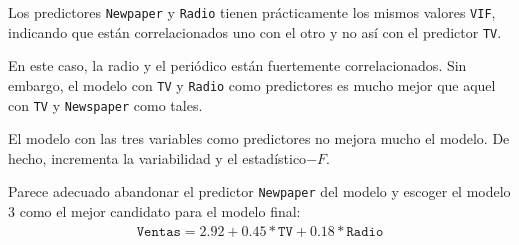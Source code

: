 Los predictores \texttt{Newpaper} y \texttt{Radio} tienen prácticamente los mismos valores \texttt{VIF}, indicando que están correlacionados uno con el otro y no así con el predictor \texttt{TV}.


En este caso, la radio y el periódico están fuertemente correlacionados. Sin embargo, el modelo con \texttt{TV} y \texttt{Radio} como predictores es mucho mejor que aquel con \texttt{TV} y \texttt{Newspaper} como tales.


El modelo con las tres variables como predictores no mejora mucho el modelo. De hecho, incrementa la variabilidad y el estadístico$-F.$


Parece adecuado abandonar el predictor \texttt{Newpaper} del modelo y escoger el modelo 3 como el mejor candidato para el modelo final:
\begin{align}
	\texttt{Ventas} = 2.92 + 0.45*\texttt{TV} + 0.18*\texttt{Radio}
\end{align}

